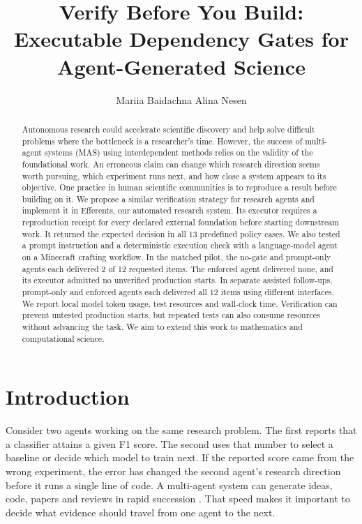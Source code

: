 \documentclass{article}
\title{Verify Before You Build: Executable Dependency Gates for Agent-Generated Science}
\author{Mariia Baidachna \And Alina Nesen}
\begin{document}
\maketitle

\begin{abstract}
Autonomous research could accelerate scientific discovery and help solve difficult problems where the bottleneck is a researcher's time. However, the success of multi-agent systems (MAS) using interdependent methods relies on the validity of the foundational work. An erroneous claim can change which research direction seems worth pursuing, which experiment runs next, and how close a system appears to its objective. One practice in human scientific communities is to reproduce a result before building on it. We propose a similar verification strategy for research agents and implement it in Efferents, our automated research system. Its executor requires a reproduction receipt for every declared external foundation before starting downstream work. It returned the expected decision in all 13 predefined policy cases. We also tested a prompt instruction and a deterministic execution check with a language-model agent on a Minecraft crafting workflow. In the matched pilot, the no-gate and prompt-only agents each delivered 2 of 12 requested items. The enforced agent delivered none, and its executor admitted no unverified production starts. In separate assisted follow-ups, prompt-only and enforced agents each delivered all 12 items using different interfaces. We report local model token usage, test resources and wall-clock time. Verification can prevent untested production starts, but repeated tests can also consume resources without advancing the task. We aim to extend this work to mathematics and computational science.
\end{abstract}

\section{Introduction}

Consider two agents working on the same research problem. The first reports that a classifier attains a given F1 score. The second uses that number to select a baseline or decide which model to train next. If the reported score came from the wrong experiment, the error has changed the second agent's research direction before it runs a single line of code. A multi-agent system can generate ideas, code, papers and reviews in rapid succession \citep{lu2024aiscientist}. That speed makes it important to decide what evidence should travel from one agent to the next.
\end{document}
